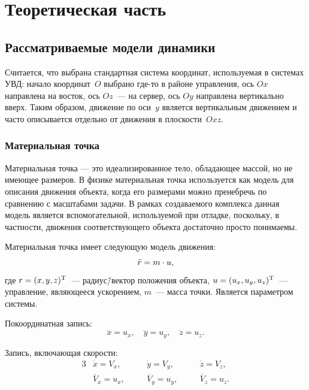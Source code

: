 \documentclass[a4paper,12pt]{article}
\begin{document}
\newpage



\section{Теоретическая часть}

\subsection{Рассматриваемые модели динамики}

Считается, что выбрана стандартная система координат, используемая в системах УВД: начало координат~$O$ выбрано где-то в районе управления, ось $Ox$ направлена на восток, ось $Oz$~--- на сервер, ось $Oy$ направлена вертикально вверх. Таким образом, движение по оси~$y$ является вертикальным движением и часто описывается отдельно от движения в плоскости~$Oxz$.


\subsubsection{Материальная точка}

Материальная точка --- это идеализированное тело, обладающее массой, но не имеющее размеров. В физике материальная точка используется как модель для описания движения объекта, когда его размерами можно пренебречь по сравнению с масштабами задачи. В рамках создаваемого комплекса данная модель является вспомогательной, используемой при отладке, поскольку, в частности, движения соответствующего объекта достаточно просто понимаемы.

Материальная точка имеет следующую модель движения:
\begin{equation}
    \Ddot{r} = m \cdot u,
\end{equation}
где $r = (x, y, z)^\text{\textup{T}}$~--- радиус\=/вектор положения объекта, $u = (u_x, u_y, u_z)^\text{\textup{T}}$~--- управление, являющееся ускорением, $m$~--- масса точки. Является параметром системы.

Покоординатная запись:
\begin{equation*}
  \ddot{x} = u_x, \quad \ddot{y} = u_y, \quad \ddot{z} = u_z.
\end{equation*}

Запись, включающая скорости:
\begin{alignat*}{3}
  & \dot{x} = V_x,  & \quad & \dot{y} = V_y, & \quad & \dot{z} = V_z, \\
  & \dot{V_x} = u_x, & & \dot{V_y} = u_y, & & \dot{V_z} = u_z.
\end{alignat*}
\end{document}
